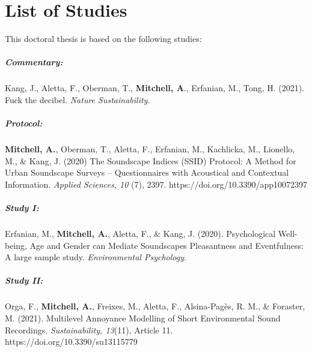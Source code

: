 \documentclass[twoside,fontsize=12pt,titlepage]{scrbook}
\begin{document}
\chapter*{List of Studies}
 
 This doctoral thesis is based on the following studies:
 
 \paragraph*{Commentary: }
 Kang, J., Aletta, F., Oberman, T., \textbf{Mitchell, A}., Erfanian, M., Tong, H. (2021). Fuck the decibel. \emph{Nature Sustainability}.
 
 \paragraph*{Protocol:  }
 \textbf{Mitchell, A.}, Oberman, T., Aletta, F., Erfanian, M., Kachlicka, M., Lionello, M., \& Kang, J. (2020) The Soundscape Indices (SSID) Protocol: A Method for Urban Soundscape Surveys -- Questionnaires with Acoustical and Contextual Information. \emph{Applied Sciences, 10} (7), 2397. https://doi.org/10.3390/app10072397
 
 
 \paragraph*{Study I:    }
 Erfanian, M., \textbf{Mitchell, A.}, Aletta, F., \& Kang, J. (2020). Psychological Well-being, Age and Gender can Mediate Soundscapes Pleasantness and Eventfulness: A large sample study. \emph{Environmental Psychology}.
 
 \paragraph*{Study II:   }
 Orga, F., \textbf{Mitchell, A.}, Freixes, M., Aletta, F., Alsina-Pagès, R. M., \& Foraster, M. (2021). Multilevel Annoyance Modelling of Short Environmental Sound Recordings. \emph{Sustainability, 13}(11), Article 11. https://doi.org/10.3390/su13115779
 
\end{document}
